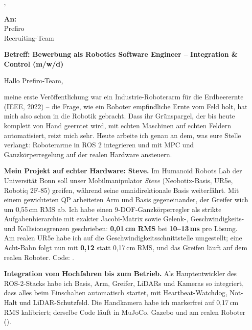 \documentclass[a4paper,10pt]{article}
\begin{document}
\cvheader
\vspace{10pt}
\hspace{0.015\textwidth}
\begin{minipage}{0.97\textwidth}

\hfill \cvcity, \cvdate

\vspace{4pt}

\textbf{An:} \\
Prefiro \\
Recruiting-Team

\vspace{5pt}
\textbf{Betreff: Bewerbung als Robotics Software Engineer -- Integration \& Control (m/w/d)}

\vspace{5pt}
Hallo Prefiro-Team,

\vspace{3pt}
meine erste Veröffentlichung war ein Industrie-Roboterarm für die Erdbeerernte (IEEE, 2022) -- die Frage, wie ein Roboter empfindliche Ernte vom Feld holt, hat mich also schon in die Robotik gebracht. Dass ihr Grünspargel, der bis heute komplett von Hand geerntet wird, mit echten Maschinen auf echten Feldern automatisiert, reizt mich sehr. Heute arbeite ich genau an dem, was eure Stelle verlangt: Roboterarme in ROS 2 integrieren und mit MPC und Ganzkörperregelung auf der realen Hardware ansteuern.

\vspace{3pt}
\textbf{Mein Projekt auf echter Hardware: Steve.} Im Humanoid Robots Lab der Universität Bonn soll unser Mobilmanipulator \textit{Steve} (Neobotix-Basis, UR5e, Robotiq 2F-85) greifen, während seine omnidirektionale Basis weiterfährt. Mit einem gewichteten QP arbeiteten Arm und Basis gegeneinander, der Greifer wich um 0,55\,cm RMS ab. Ich habe einen 9-DOF-Ganzkörperregler als strikte Aufgabenhierarchie mit exakter Jacobi-Matrix sowie Gelenk-, Geschwindigkeits- und Kollisionsgrenzen geschrieben: \textbf{0,01\,cm RMS} bei \textbf{10--13\,ms} pro Lösung. Am realen UR5e habe ich auf die Geschwindigkeitsschnittstelle umgestellt; eine Acht-Bahn folgt nun mit \textbf{0,12} statt 0,17\,cm RMS, und das Greifen läuft auf dem realen Roboter. Code: .

\vspace{3pt}
\textbf{Integration vom Hochfahren bis zum Betrieb.} Als Hauptentwickler des ROS-2-Stacks habe ich Basis, Arm, Greifer, LiDARs und Kameras so integriert, dass alles beim Einschalten automatisch startet, mit Heartbeat-Watchdog, Not-Halt und LiDAR-Schutzfeld. Die Handkamera habe ich markerfrei auf 0,17\,cm RMS kalibriert; derselbe Code läuft in MuJoCo, Gazebo und am realen Roboter ().


\end{minipage}
\end{document}
